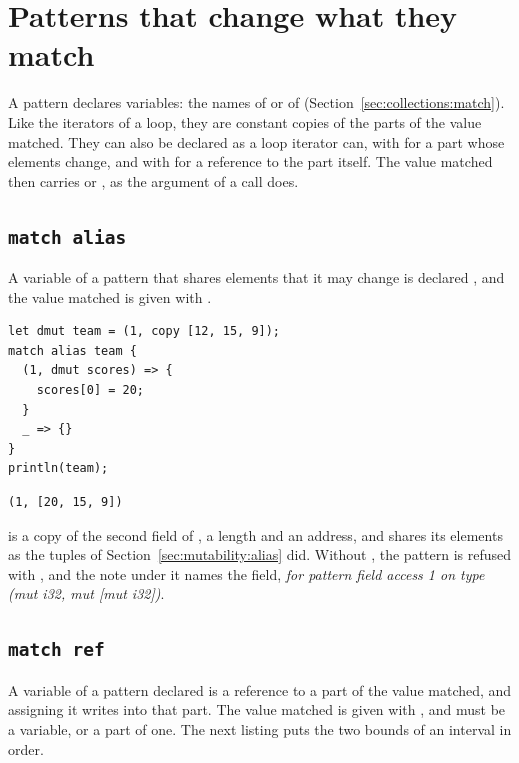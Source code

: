 \vfill\pagebreak
\section{Patterns that change what they match}
\label{sec:mutability:patterns}

A pattern declares variables: the names of  or of
 (Section~\ref{sec:collections:match}). Like the iterators of a
loop, they are constant copies of the parts of the value matched. They can also
be declared as a loop iterator can, with  for a part whose elements
change, and with  for a reference to the part itself. The value
matched then carries  or , as the argument of a call
does.

\subsection{\texttt{match alias}}

A variable of a pattern that shares elements that it may change is declared
, and the value matched is given with .

\begin{lstlisting}[style=coloredverbatim]
let dmut team = (1, copy [12, 15, 9]);
match alias team {
  (1, dmut scores) => {
    scores[0] = 20;
  }
  _ => {}
}
println(team);
\end{lstlisting}
\vspace{-10pt}%
\begin{lstlisting}[style=bashVerb]
(1, [20, 15, 9])
\end{lstlisting}

 is a copy of the second field of , a length and an
address, and shares its elements as the tuples of
Section~\ref{sec:mutability:alias} did. Without , the pattern is
refused with ,
and the note under it names the field, \textit{for pattern field access 1 on
  type (mut i32, mut [mut i32])}.

\subsection{\texttt{match ref}}

A variable of a pattern declared  is a reference to a part of
the value matched, and assigning it writes into that part. The value matched is
given with , and must be a variable, or a part of one. The next
listing puts the two bounds of an interval in order.

